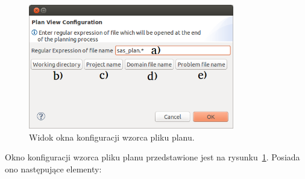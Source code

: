 \begin{figure}[h!]
    \centering
    \includegraphics[width=0.8\textwidth]{img/plan_view_dialog}
    \caption{Widok okna konfiguracji wzorca pliku planu.}
    \label{fig:plan_view_window}
\end{figure}


Okno konfiguracji wzorca pliku planu przedstawione jest na rysunku~\ref{fig:plan_view_window}. Posiada ono następujące elementy:

